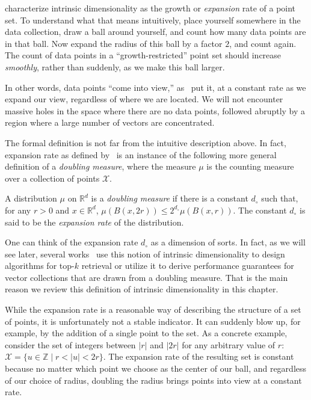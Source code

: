 \cite{karger2002growth-restricted-metrics} characterize intrinsic dimensionality
as the growth or \emph{expansion} rate of a point set. To understand what that means
intuitively, place yourself somewhere in the data collection, draw a ball around
yourself, and count how many data points are in that ball. Now expand the radius
of this ball by a factor $2$, and count again. The count of data points in a
``growth-restricted'' point set should increase \emph{smoothly}, rather than suddenly,
as we make this ball larger.

\begin{svgraybox}
In other words, data points ``come into view,'' as~\cite{karger2002growth-restricted-metrics}
put it, at a constant rate as we expand our view, regardless of where we are located.
We will not encounter massive holes in the space where there are no data points,
followed abruptly by a region where a large number of vectors are concentrated.
\end{svgraybox}

The formal definition is not far from the intuitive description above.
In fact, expansion rate as defined by~\cite{karger2002growth-restricted-metrics}
is an instance of the following more general definition of a \emph{doubling measure},
where the measure $\mu$ is the counting measure over a collection of points $\mathcal{X}$.

\begin{definition}
    \label{definition:doubling-measure}
    A distribution $\mu$ on $\mathbb{R}^d$ is a \emph{doubling measure} if there is a constant $d_\circ$
    such that, for any $r > 0$ and $x \in \mathbb{R}^d$, $\mu(B(x, 2r)) \leq 2^{d_\circ} \mu(B(x, r))$.
    The constant $d_\circ$ is said to be the \emph{expansion rate} of the distribution.
\end{definition}

One can think of the expansion rate $d_\circ$ as a dimension of sorts.
In fact, as we will see later, several
works~\citep{dasgupta2015rptrees,karger2002growth-restricted-metrics,covertrees}
use this notion of intrinsic dimensionality to design algorithms for
top-$k$ retrieval or utilize it to derive performance guarantees for
vector collections that are drawn from a doubling measure.
That is the main reason we review this definition of intrinsic dimensionality
in this chapter.

While the expansion rate is a reasonable way of describing the structure of a set of
points, it is unfortunately not a stable indicator. It can suddenly blow up,
for example, by the addition of a single point to the set. As a concrete example,
consider the set of integers between $\lvert r \rvert$ and $\lvert 2r \rvert$
for any arbitrary value of $r$: $\mathcal{X} = \{ u \in \mathbb{Z} \;|\; r < \lvert u \rvert < 2r \}$.
The expansion rate of the resulting set is constant because no matter
which point we choose as the center of our ball, and regardless of our choice
of radius, doubling the radius brings points into view at a constant rate.

